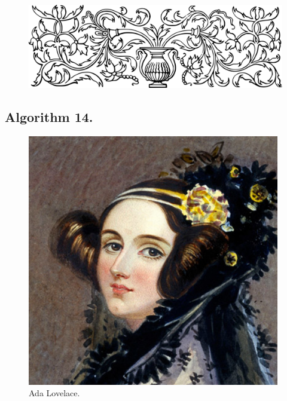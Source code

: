 \documentclass[preview]{standalone}
\begin{document}
\begin{figure}[!h]
    \centering
    \includegraphics[width=14cm]{../resources/jpg/3.1.algorithms/border1.png}
\end{figure}
\subsection[Maximum, medium, mean, and mininum.]{
    \color{section} Algorithm 14.
}

\vspace{1\baselineskip}
\begin{center}
    
\end{center}
\pagebreak
\begin{center}
    
\end{center}
\begin{figure}[!h]
    \centering
    \includegraphics[width=11cm]{../resources/jpg/3.1.algorithms/lovelace.jpg}
    \caption*{Ada Lovelace.}
\end{figure}
\end{document}
